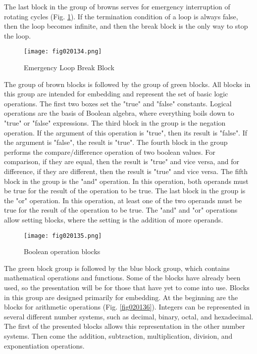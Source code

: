 The last block in the group of browns serves for emergency interruption of rotating cycles (Fig. \ref{fig020134}). If the termination condition of a loop is always false, then the loop becomes infinite, and then the break block is the only way to stop the loop.

\begin{figure}[H]
   \centering
   \texttt{[image: fig020134.png]}
   \caption{Emergency Loop Break Block}
\label{fig020134}
\end{figure}

The group of brown blocks is followed by the group of green blocks. All blocks in this group are intended for embedding and represent the set of basic logic operations. The first two boxes set the "true" and "false" constants. Logical operations are the basis of Boolean algebra, where everything boils down to "true" or "false" expressions. The third block in the group is the negation operation. If the argument of this operation is "true", then its result is "false". If the argument is "false", the result is "true". The fourth block in the group performs the compare/difference operation of two boolean values. For comparison, if they are equal, then the result is "true" and vice versa, and for difference, if they are different, then the result is "true" and vice versa. The fifth block in the group is the "and" operation. In this operation, both operands must be true for the result of the operation to be true. The last block in the group is the "or" operation. In this operation, at least one of the two operands must be true for the result of the operation to be true. The "and" and "or" operations allow setting blocks, where the setting is the addition of more operands.

\begin{figure}[H]
   \centering
   \texttt{[image: fig020135.png]}
   \caption{Boolean operation blocks}
\label{fig020135}
\end{figure}

The green block group is followed by the blue block group, which contains mathematical operations and functions. Some of the blocks have already been used, so the presentation will be for those that have yet to come into use. Blocks in this group are designed primarily for embedding. At the beginning are the blocks for arithmetic operations (Fig. \ref{fig020136}). Integers can be represented in several different number systems, such as decimal, binary, octal, and hexadecimal. The first of the presented blocks allows this representation in the other number systems. Then come the addition, subtraction, multiplication, division, and exponentiation operations.

